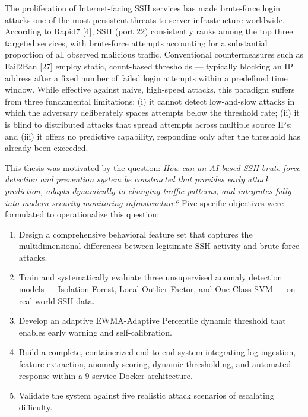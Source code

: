 \documentclass[
  a4paper]{report}
\providecommand{\tightlist}{%
  \setlength{\itemsep}{0pt}\setlength{\parskip}{0pt}}
\begin{document}
The proliferation of Internet-facing SSH services has made brute-force
login attacks one of the most persistent threats to server
infrastructure worldwide. According to Rapid7 {[}4{]}, SSH (port 22)
consistently ranks among the top three targeted services, with
brute-force attempts accounting for a substantial proportion of all
observed malicious traffic. Conventional countermeasures such as
Fail2Ban {[}27{]} employ static, count-based thresholds --- typically
blocking an IP address after a fixed number of failed login attempts
within a predefined time window. While effective against naive,
high-speed attacks, this paradigm suffers from three fundamental
limitations: (i) it cannot detect low-and-slow attacks in which the
adversary deliberately spaces attempts below the threshold rate; (ii) it
is blind to distributed attacks that spread attempts across multiple
source IPs; and (iii) it offers no predictive capability, responding
only after the threshold has already been exceeded.

This thesis was motivated by the question: \emph{How can an AI-based SSH
brute-force detection and prevention system be constructed that provides
early attack prediction, adapts dynamically to changing traffic
patterns, and integrates fully into modern security monitoring
infrastructure?} Five specific objectives were formulated to
operationalize this question:

\begin{enumerate}
\def\labelenumi{\arabic{enumi}.}
\tightlist
\item
  Design a comprehensive behavioral feature set that captures the
  multidimensional differences between legitimate SSH activity and
  brute-force attacks.
\item
  Train and systematically evaluate three unsupervised anomaly detection
  models --- Isolation Forest, Local Outlier Factor, and One-Class SVM
  --- on real-world SSH data.
\item
  Develop an adaptive EWMA-Adaptive Percentile dynamic threshold that
  enables early warning and self-calibration.
\item
  Build a complete, containerized end-to-end system integrating log
  ingestion, feature extraction, anomaly scoring, dynamic thresholding,
  and automated response within a 9-service Docker architecture.
\item
  Validate the system against five realistic attack scenarios of
  escalating difficulty.
\end{enumerate}
\end{document}
